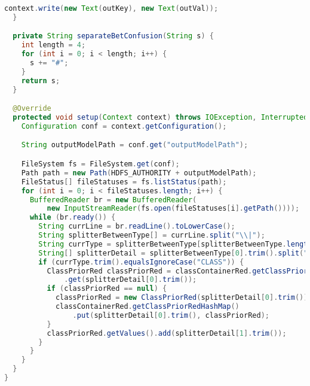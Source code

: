 \begin{lstlisting}[language=Java,basicstyle=\tiny,caption=TestingReducer.java]
    context.write(new Text(outKey), new Text(outVal));
  }

  private String separateBetConfusion(String s) {
    int length = 4;
    for (int i = 0; i < length; i++) {
      s += "#";
    }
    return s;
  }

  @Override
  protected void setup(Context context) throws IOException, InterruptedException {
    Configuration conf = context.getConfiguration();

    String outputModelPath = conf.get("outputModelPath");

    FileSystem fs = FileSystem.get(conf);
    Path path = new Path(HDFS_AUTHORITY + outputModelPath);
    FileStatus[] fileStatuses = fs.listStatus(path);
    for (int i = 0; i < fileStatuses.length; i++) {
      BufferedReader br = new BufferedReader(
          new InputStreamReader(fs.open(fileStatuses[i].getPath())));
      while (br.ready()) {
        String currLine = br.readLine().toLowerCase();
        String splitterBetweenType[] = currLine.split("\\|");
        String currType = splitterBetweenType[splitterBetweenType.length - 1].trim();
        String[] splitterDetail = splitterBetweenType[0].trim().split(",");
        if (currType.trim().equalsIgnoreCase("CLASS")) {
          ClassPriorRed classPriorRed = classContainerRed.getClassPriorRedHashMap()
              .get(splitterDetail[0].trim());
          if (classPriorRed == null) {
            classPriorRed = new ClassPriorRed(splitterDetail[0].trim());
            classContainerRed.getClassPriorRedHashMap()
                .put(splitterDetail[0].trim(), classPriorRed);
          }
          classPriorRed.getValues().add(splitterDetail[1].trim());
        }
      }
    }
  }
}
\end{lstlisting}


